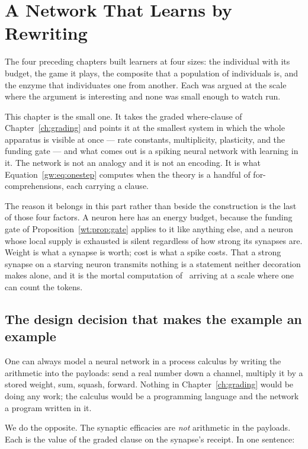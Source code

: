 \chapter{A Network That Learns by Rewriting}
\label{ch:spiking}

The four preceding chapters built learners at four sizes: the individual with its
budget, the game it plays, the composite that a population of individuals is, and the
enzyme that individuates one from another. Each was argued at the scale where the
argument is interesting and none was small enough to watch run.

This chapter is the small one. It takes the graded where-clause of
Chapter~\ref{ch:grading} and points it at the smallest system in which the whole
apparatus is visible at once --- rate constants, multiplicity, plasticity, and the
funding gate --- and what comes out is a spiking neural network with learning in it. The
network is not an analogy and it is not an encoding. It is what
Equation~\eqref{gw:eq:onestep} computes when the theory is a handful of
for-comprehensions, each carrying a clause.

The reason it belongs in this part rather than beside the construction is the last of
those four factors. A neuron here has an energy budget, because the funding gate of
Proposition~\ref{wt:prop:gate} applies to it like anything else, and a neuron whose local
supply is exhausted is silent regardless of how strong its synapses are. Weight is what a
synapse is worth; cost is what a spike costs. That a strong synapse on a starving neuron
transmits nothing is a statement neither decoration makes alone, and it is the mortal
computation of \chSci\ arriving at a scale where one can count the tokens.

\section{The design decision that makes the example an example}

One can always model a neural network in a process calculus by writing the arithmetic
into the payloads: send a real number down a channel, multiply it by a stored weight,
sum, squash, forward. Nothing in Chapter~\ref{ch:grading} would be doing any work; the
calculus would be a programming language and the network a program written in it.

We do the opposite. The synaptic efficacies are \emph{not} arithmetic in the payloads.
Each is the value of the graded clause on the synapse's receipt. In one sentence:

